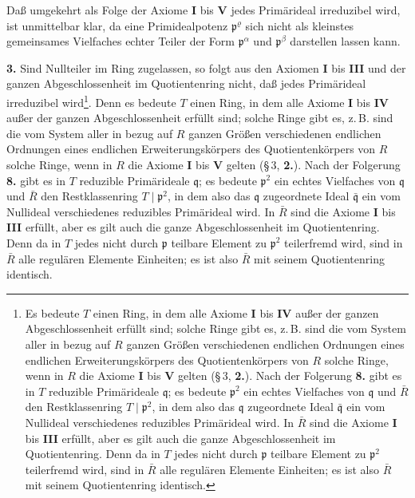 \documentclass[12pt,a4paper]{article}
\theoremstyle{plain}
\theoremstyle{definition}
\theoremstyle{remark}
\begin{document}
Daß umgekehrt als Folge der Axiome \textbf{I} bis \textbf{V} jedes Primärideal irreduzibel wird, ist unmittelbar klar, da eine Primidealpotenz $\mathfrak{p}^{\varrho}$ sich nicht als kleinstes gemeinsames Vielfaches echter Teiler der Form $\mathfrak{p}^{\alpha}$ und $\mathfrak{p}^{\beta}$ darstellen lassen kann.

\medskip
\noindent
\textbf{3.} Sind Nullteiler im Ring zugelassen, so folgt aus den Axiomen \textbf{I} bis \textbf{III} und der ganzen Abgeschlossenheit im Quotientenring nicht, daß jedes Primärideal irreduzibel wird\footnote{Es bedeute $T$ einen Ring, in dem alle Axiome \textbf{I} bis \textbf{IV} außer der ganzen Abgeschlossenheit erfüllt sind; solche Ringe gibt es, z.\,B. sind die vom System aller in bezug auf $R$ ganzen Größen verschiedenen endlichen Ordnungen eines endlichen Erweiterungskörpers des Quotientenkörpers von $R$ solche Ringe, wenn in $R$ die Axiome \textbf{I} bis \textbf{V} gelten (\S\,3, \textbf{2.}). Nach der Folgerung \textbf{8.} gibt es in $T$ reduzible Primärideale $\mathfrak{q}$; es bedeute $\mathfrak{p}^{2}$ ein echtes Vielfaches von $\mathfrak{q}$ und $\bar{R}$ den Restklassenring $T \mid \mathfrak{p}^{2}$, in dem also das $\mathfrak{q}$ zugeordnete Ideal $\bar{\mathfrak{q}}$ ein vom Nullideal verschiedenes reduzibles Primärideal wird. In $\bar{R}$ sind die Axiome \textbf{I} bis \textbf{III} erfüllt, aber es gilt auch die ganze Abgeschlossenheit im Quotientenring. Denn da in $T$ jedes nicht durch $\mathfrak{p}$ teilbare Element zu $\mathfrak{p}^{2}$ teilerfremd wird, sind in $\bar{R}$ alle regulären Elemente Einheiten; es ist also $\bar{R}$ mit seinem Quotientenring identisch.}. Denn es bedeute $T$ einen Ring, in dem alle Axiome \textbf{I} bis \textbf{IV} außer der ganzen Abgeschlossenheit erfüllt sind; solche Ringe gibt es, z.\,B. sind die vom System aller in bezug auf $R$ ganzen Größen verschiedenen endlichen Ordnungen eines endlichen Erweiterungskörpers des Quotientenkörpers von $R$ solche Ringe, wenn in $R$ die Axiome \textbf{I} bis \textbf{V} gelten (\S\,3, \textbf{2.}). Nach der Folgerung \textbf{8.} gibt es in $T$ reduzible Primärideale $\mathfrak{q}$; es bedeute $\mathfrak{p}^{2}$ ein echtes Vielfaches von $\mathfrak{q}$ und $\bar{R}$ den Restklassenring $T \mid \mathfrak{p}^{2}$, in dem also das $\mathfrak{q}$ zugeordnete Ideal $\bar{\mathfrak{q}}$ ein vom Nullideal verschiedenes reduzibles Primärideal wird. In $\bar{R}$ sind die Axiome \textbf{I} bis \textbf{III} erfüllt, aber es gilt auch die ganze Abgeschlossenheit im Quotientenring. Denn da in $T$ jedes nicht durch $\mathfrak{p}$ teilbare Element zu $\mathfrak{p}^{2}$ teilerfremd wird, sind in $\bar{R}$ alle regulären Elemente Einheiten; es ist also $\bar{R}$ mit seinem Quotientenring identisch.
\end{document}
